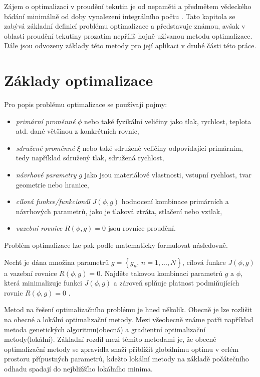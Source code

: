 Zájem o optimalizaci v proudění tekutin je od nepaměti a předmětem vědeckého bádání minimálně od doby vynalezení integrálního počtu \cite{karman1997inverse}. Tato kapitola se zabývá základní definicí problému optimalizace a představuje známou, avšak v oblasti proudění tekutiny prozatím nepříliš hojně užívanou metodu optimalizace. Dále jsou odvozeny základy této metody pro její aplikaci v druhé části této práce.
\section{Základy optimalizace}\label{sec:zaklady_opt}
Pro popis problému optimalizace se používají pojmy:
\begin{itemize}
	\item \textit{primární proměnné} $ \phi $ nebo také fyzikální veličiny jako tlak, rychlost, teplota atd. dané většinou z konkrétních rovnic,
	\item \textit{sdružené proměnné} $ \xi $ nebo také sdružené veličiny odpovídající primárním, tedy například sdružený tlak, sdružená rychlost,
	\item \textit{návrhové parametry} $ g $ jako jsou materiálové vlastnosti, vstupní rychlost, tvar geometrie nebo hranice,
	\item \textit{cílová funkce/funkcionál} $ J(\phi,g) $ hodnocení kombinace primárních a návrhových parametrů, jako je tlaková ztráta, stlačení nebo vztlak,
	\item \textit{vazební rovnice} $ R(\phi,g)=0 $ jsou rovnice proudění.
\end{itemize}
Problém optimalizace lze pak podle \cite{karman1997inverse} matematicky formulovat následovně. 
\begin{problem}\label{prob:optimalizace}
Nechť je dána množina parametrů $ g=\left\lbrace g_n, \, n=1,...,N\right\rbrace $, cílová funkce $ J(\phi, g) $ a vazební rovnice $ R(\phi, g)=0 $. 
Najděte takovou kombinaci parametrů $ g $ a $ \phi $, která minimalizuje funkci $ J(\phi, g) $ a zároveň splňuje platnost podmiňujících rovnic $ R(\phi, g)=0$ . 
\end{problem}
Metod na řešení optimalizačního problému je hned několik.
Obecně je lze rozlišit na obecné a lokální optimalizační metody. Mezi všeobecně známe patři například metoda genetických algoritmu(obecná) a gradientní optimalizační metody(lokální). 
Základní rozdíl mezi těmito metodami je, že obecné optimalizační metody se zpravidla snaží přiblížit globálnímu optimu v celém prostoru přípustných parametrů, kdežto lokální metody na základě počátečního odhadu spadají do nejbližšího lokálního minima.

